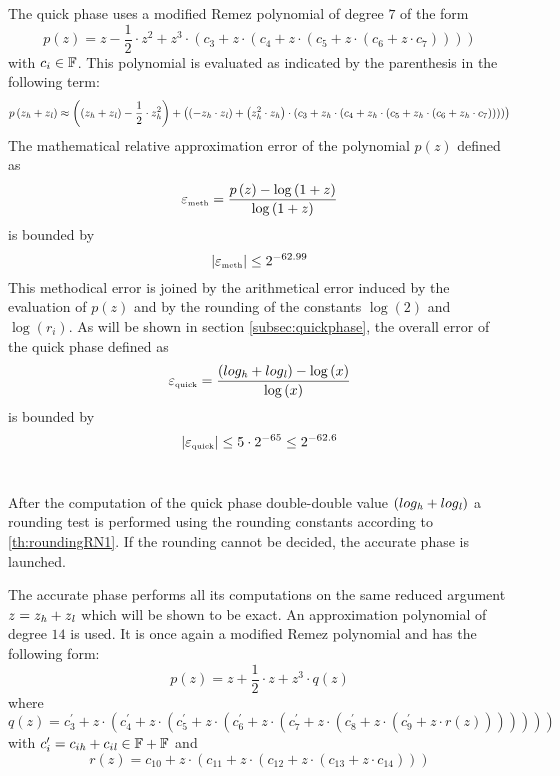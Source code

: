 The quick phase uses a modified Remez polynomial of degree $7$ of the form
$$p\left( z \right) = z - \frac{1}{2} \cdot z^2 + z^3 \cdot 
\left( c_3 + z \cdot \left( c_4 + z \cdot \left( c_5 + z \cdot \left( c_6 + z \cdot c_7 \right) \right) \right) \right)$$
with $c_i \in \F$.
This polynomial is evaluated as indicated by the parenthesis in the following term: 
$$p\left( z_\hi + z_\lo \right) \approx \left( \left(z_\hi + z_\lo \right) - \frac{1}{2} \cdot  z_\hi^2\right) + 
\left( \left( - z_\hi \cdot z_\lo \right) + 
\left(z_\hi^2 \cdot z_\hi \right) \cdot 
\left( c_3 + z_\hi \cdot \left( c_4 + z_\hi \cdot \left( c_5 + z_\hi \cdot \left( c_6 + z_\hi \cdot c_7 \right) \right) \right) \right) \right)$$
The mathematical relative approximation error of the polynomial $p\left( z \right)$ defined as
$$\epsilon_{\mbox{\tiny meth}} = \frac{p\left( z \right) - \log\left( 1 + z \right)}{\log\left(1 + z \right)}$$ is bounded by
$$\left \vert \epsilon_{\mbox{\tiny meth}} \right \vert \leq 2^{-62.99}$$
This methodical error is joined by the arithmetical error induced by the evaluation of $p\left( z \right)$ 
and by the rounding of the constants $\log\left( 2 \right)$ and $\log\left( r_i \right)$. 
As will be shown in section \ref{subsec:quickphase}, the overall error of the quick phase defined as
$$\epsilon_{\mbox{\tiny quick}} = \frac{\left(log_\hi + log_\lo\right) - \log\left(x\right)}{\log\left(x\right)}$$
is bounded by
$$\left \vert \epsilon_{\mbox{\tiny quick}} \right \vert \leq 5 \cdot 2^{-65} \leq 2^{-62.6}$$ ~ \par
After the computation of the quick phase double-double value $\left( log_\hi + log_\lo \right)$ a rounding test is performed
using the rounding constants according to \ref{th:roundingRN1}. If the rounding cannot be decided, the accurate 
phase is launched. \par
The accurate phase performs all its computations on the same reduced argument $z = z_\hi + z_\lo$ which will be shown to be 
exact. An approximation polynomial of degree $14$ is used. It is once again a modified Remez polynomial and has the 
following form:
$$p\left( z \right) = z + \frac{1}{2} \cdot z + z^3 \cdot q\left( z \right)$$
where 
$$q\left( z \right) = 
c^\prime_3 + z \cdot \left( 
c^\prime_4 + z \cdot \left( 
c^\prime_5 + z \cdot \left( 
c^\prime_6 + z \cdot \left( 
c^\prime_7 + z \cdot \left( 
c^\prime_8 + z \cdot \left( 
c^\prime_9 + z \cdot r\left( z \right) \right) \right) \right) \right) \right) \right)$$
with
$c^\prime_i = c_{i\hi} + c_{i\lo} \in \F + \F$ and
$$r\left( z \right) = 
c_{10} + z \cdot \left(
c_{11} + z \cdot \left(
c_{12} + z \cdot \left(
c_{13} + z \cdot c_{14} \right) \right) \right)$$
